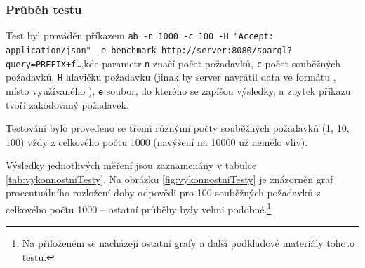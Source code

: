 
\subsubsection{Průběh testu}
Test byl prováděn příkazem \texttt{ab -n 1000 -c 100 -H "Accept: application\linebreak /json"\ -e benchmark http://server:8080/sparql?query=PREFIX+f\dots},\linebreak kde parametr \texttt{n} značí počet požadavků, \texttt{c} počet souběžných požadavků, \texttt{H} hlavičku požadavku (jinak by server navrátil data ve formátu , místo využívaného ), \texttt{e} soubor, do kterého se zapíšou výsledky, a zbytek příkazu tvoří zakódovaný  požadavek.

Testování bylo provedeno se třemi různými počty souběžných požadavků (1, 10, 100) vždy z celkového počtu 1000 (navýšení na 10000 už nemělo vliv).

Výsledky jednotlivých měření jsou zaznamenány v tabulce \ref{tab:vykonnostniTesty}. Na obrázku \ref{fig:vykonnostniTesty} je znázorněn graf procentuálního rozložení doby odpovědi pro 100 souběžných požadavků z celkového počtu 1000 -- ostatní průběhy byly velmi podobné.\footnote{Na přiloženém  se nacházejí ostatní grafy a další podkladové materiály tohoto testu.}

